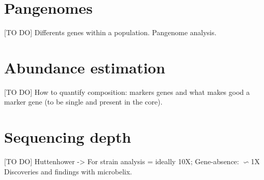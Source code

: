 \section{Pangenomes}
[TO DO]
Differents genes within a population. Pangenome analysis.


\section{Abundance estimation}
[TO DO]
How to quantify composition: markers genes and what makes good a marker gene (to be single and present in the core).

\section{Sequencing depth}
[TO DO]
Huttenhower -> For strain analysis = ideally 10X; Gene-absence: \(\backsim\)1X
Discoveries and findings with microbelix. 